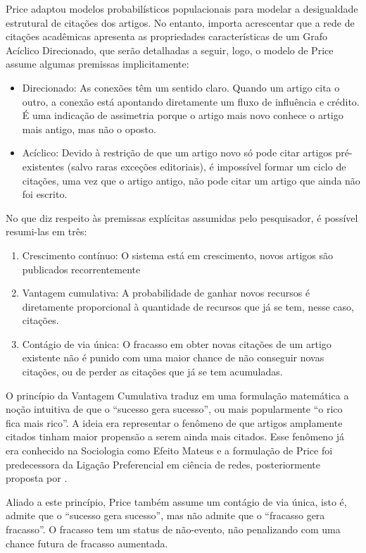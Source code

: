 \documentclass[12pt,oneside,a4paper,brazil,sumario=tradicional]{abntex2}
\begin{document}
Price adaptou modelos probabilísticos populacionais para modelar a desigualdade estrutural de citações dos artigos. No entanto, importa acrescentar que a rede de citações acadêmicas apresenta as propriedades características de um Grafo Acíclico Direcionado, que serão detalhadas a seguir, logo, o modelo de Price assume algumas premissas implicitamente:

\begin{itemize}
  \item Direcionado: As conexões têm um sentido claro. Quando um artigo cita o outro, a conexão está apontando diretamente um fluxo de influência e crédito. É  uma indicação de assimetria porque o artigo mais novo conhece o artigo mais antigo, mas não o oposto.
  \item Acíclico: Devido à restrição de que um artigo novo só pode citar artigos pré-existentes (salvo raras exceções editoriais), é impossível formar um ciclo de citações, uma vez que o artigo antigo, não pode citar um artigo que ainda não foi escrito.
\end{itemize}

No que diz respeito às premissas explícitas assumidas pelo pesquisador, é possível resumi-las em três:

\begin{enumerate}
  \item Crescimento contínuo: O sistema está em crescimento, novos artigos são publicados recorrentemente
  \item Vantagem cumulativa: A probabilidade de ganhar novos recursos é diretamente proporcional à quantidade de recursos que já se tem, nesse caso, citações.
  \item Contágio de via única:  O fracasso em obter novas citações de um artigo existente não é punido com uma maior chance de não conseguir novas citações, ou de perder as citações que já se tem acumuladas.
\end{enumerate}

O princípio da Vantagem Cumulativa traduz em uma formulação matemática a noção intuitiva de que o “sucesso gera sucesso”, ou mais popularmente “o rico fica mais rico”. A ideia era representar o fenômeno de que artigos amplamente citados tinham maior propensão a serem ainda mais citados. Esse fenômeno já era conhecido na Sociologia como Efeito Mateus \parencite{merton1968} e a formulação de Price foi predecessora da Ligação Preferencial em ciência de redes, posteriormente proposta por \textcite{barabasi1999}.

Aliado a este princípio, Price também assume um contágio de via única, isto é, admite que o “sucesso gera sucesso”, mas não admite que o “fracasso gera fracasso”. O fracasso tem um status de não-evento, não penalizando com uma chance futura de fracasso aumentada.
\end{document}
